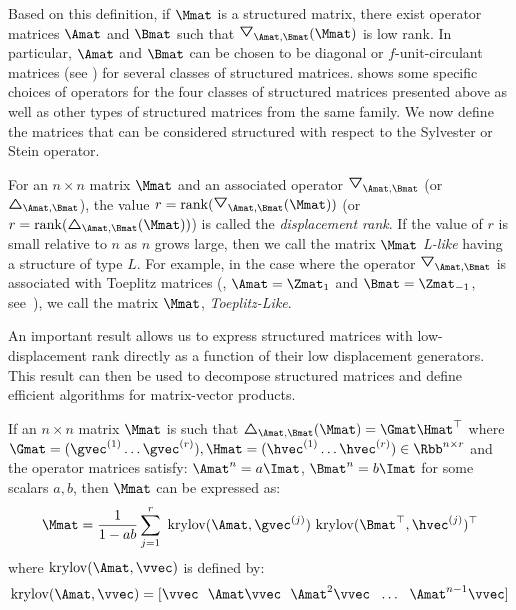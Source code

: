 \noindent
Based on this definition, if $\Mmat$ is a structured matrix, there exist operator matrices $\Amat$ and $\Bmat$ such that $\triangleopdown_{\Amat, \Bmat} (\Mmat)$ is low rank.
In particular, $\Amat$ and $\Bmat$ can be chosen to be diagonal or $f$-unit-circulant matrices (see ) for several classes of structured matrices.
 shows some specific choices of operators for the four classes of structured matrices presented above as well as other types of structured matrices from the same family.
We now define the matrices that can be considered structured with respect to the Sylvester or Stein operator.
\begin{definition}
  For an $n \times n$ matrix $\Mmat$ and an associated operator $\triangleopdown_{\Amat, \Bmat}$ (or $\triangleopup_{\Amat, \Bmat}$), the value $r = \rank(\triangleopdown_{\Amat, \Bmat}(\Mmat))$ (or $r = \rank(\triangleopup_{\Amat, \Bmat}(\Mmat))$) is called the \emph{displacement rank}.
    If the value of $r$ is small relative to $n$ as $n$ grows large, then we call the matrix $\Mmat$ \emph{L-like} having a structure of type $L$.
    For example, in the case where the operator $\triangleopdown_{\Amat, \Bmat}$ is associated with Toeplitz matrices (\ie, $\Amat = \Zmat_1$ and $\Bmat = \Zmat_{-1}$, see~), we call the matrix $\Mmat$, \emph{Toeplitz-Like}.
  \label{definition:ch2-l_like_matrices}
\end{definition}

An important result allows us to express structured matrices with low-displacement rank directly as a function of their low displacement generators.
This result can then be used to decompose structured matrices and define efficient algorithms for matrix-vector products.

\begin{theorem} \label{theorem:ch2-krylov_decomposition}
  If an $n \times n$ matrix $\Mmat$ is such that $\triangleopup_{\Amat, \Bmat}(\Mmat) = \Gmat \Hmat^\top$ where 
  $\Gmat = (\gvec^{(1)} \ldots \gvec^{(r)}), \Hmat = (\hvec^{(1)} \ldots \hvec^{(r)}) \in \Rbb^{n \times r}$ 
  and the operator matrices satisfy: $\Amat^n = a \Imat$, $\Bmat^n = b \Imat$ for some scalars $a, b$, then $\Mmat$ can be expressed as: 
  \begin{equation} \label{equation:ch2-krylov_decomposition}
    \Mmat = \frac{1}{1 - ab} \sum_{j=1}^{r} ~\krylov(\Amat, \gvec^{(j)}) ~\krylov(\Bmat^\top, \hvec^{(j)})^\top
  \end{equation}
  where $\krylov(\Amat, \vvec)$ is defined by:
  \begin{equation}
    \krylov(\Amat, \vvec) = [\vvec~~\Amat\vvec~~\Amat^2 \vvec~~\ldots~~\Amat^{n-1} \vvec]
  \end{equation}
  \removespace
\end{theorem}

